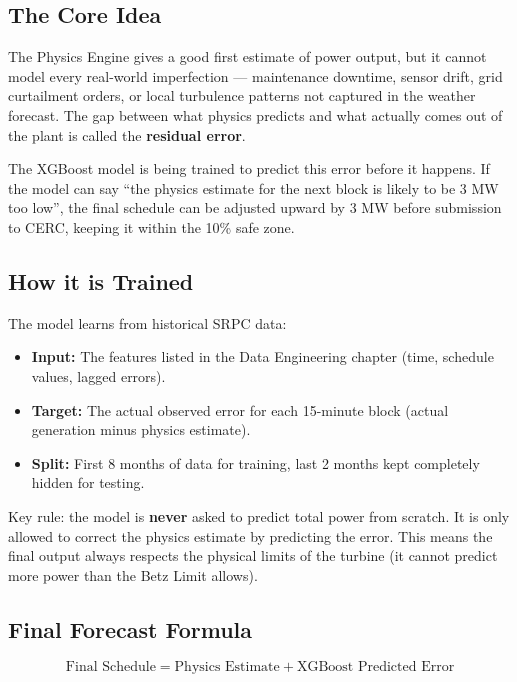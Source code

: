 \documentclass[12pt,a4paper]{report}
\begin{document}
\subsection{The Core Idea}

The Physics Engine gives a good first estimate of power output, but it cannot model every real-world imperfection --- maintenance downtime, sensor drift, grid curtailment orders, or local turbulence patterns not captured in the weather forecast. The gap between what physics predicts and what actually comes out of the plant is called the \textbf{residual error}.

The XGBoost model is being trained to predict this error before it happens. If the model can say ``the physics estimate for the next block is likely to be 3 MW too low'', the final schedule can be adjusted upward by 3 MW before submission to CERC, keeping it within the 10\% safe zone.

\subsection{How it is Trained}

The model learns from historical SRPC data:
\begin{itemize}
    \item \textbf{Input:} The features listed in the Data Engineering chapter (time, schedule values, lagged errors).
    \item \textbf{Target:} The actual observed error for each 15-minute block (actual generation minus physics estimate).
    \item \textbf{Split:} First 8 months of data for training, last 2 months kept completely hidden for testing.
\end{itemize}

Key rule: the model is \textbf{never} asked to predict total power from scratch. It is only allowed to correct the physics estimate by predicting the error. This means the final output always respects the physical limits of the turbine (it cannot predict more power than the Betz Limit allows).

\subsection{Final Forecast Formula}

\begin{equation}
    \text{Final Schedule} = \text{Physics Estimate} + \text{XGBoost Predicted Error}
\end{equation}
\end{document}
